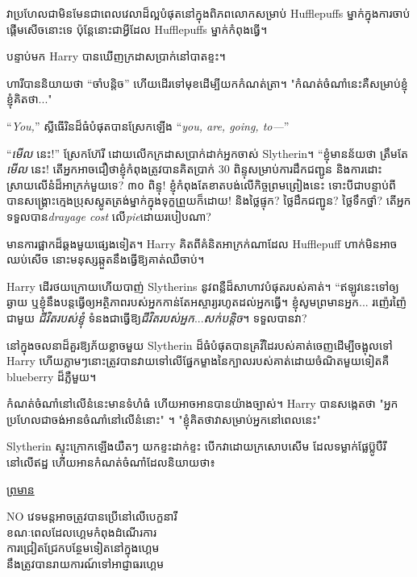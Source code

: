វាប្រហែលជាមិនមែនជាពេលវេលាដ៏ល្អបំផុតនៅក្នុងពិភពលោកសម្រាប់ Hufflepuffs ម្នាក់ក្នុងការចាប់ផ្តើមសើចនោះទេ ប៉ុន្តែនោះជាអ្វីដែល Hufflepuffs ម្នាក់កំពុងធ្វើ។

បន្ទាប់មក Harry បានឃើញក្រដាសប្រាក់នៅបាតខ្ទះ។

ហារី​បាន​និយាយ​ថា “ចាំ​បន្តិច” ហើយ​ដើរ​ទៅ​មុខ​ដើម្បី​យក​កំណត់​ត្រា។ "កំណត់ចំណាំនេះគឺសម្រាប់ខ្ញុំ ខ្ញុំគិតថា..."

“\emph{You,}” ស្លីធើរិនដ៏ធំបំផុតបានស្រែកឡើង “\emph{you, are, going, to—}”

“\emph{មើល} នេះ!” ស្រែក​ហ៊ែរី ដោយ​លើក​ក្រដាស​ប្រាក់​ដាក់​អ្នក​ចាស់ Slytherin។ “ខ្ញុំមានន័យថា ត្រឹមតែ\emph{មើល} នេះ! តើអ្នកអាចជឿថាខ្ញុំកំពុងត្រូវបានគិតប្រាក់ 30 ពិន្ទុសម្រាប់ការដឹកជញ្ជូន និងការដោះស្រាយលើនំដ៏អាក្រក់មួយទេ? ៣០ ពិន្ទុ! ខ្ញុំ​កំពុង​តែ​ខាតបង់​លើ​កិច្ច​ព្រម​ព្រៀង​នេះ ទោះ​បី​ជា​បន្ទាប់​ពី​បាន​សង្គ្រោះ​ក្មេង​ប្រុស​ស្លូត​ត្រង់​ម្នាក់​ក្នុង​ទុក្ខ​ព្រួយ​ក៏​ដោយ! និងថ្លៃផ្ទុក? ថ្លៃដឹកជញ្ជូន? ថ្លៃទឹកថ្នាំ? តើអ្នកទទួលបាន\emph{drayage cost} លើ\emph{pie}ដោយរបៀបណា?

មាន​ការ​ផ្អាក​ដ៏​ឆ្គង​មួយ​ផ្សេង​ទៀត។ Harry គិត​ពី​គំនិត​អាក្រក់​ណា​ដែល Hufflepuff ហាក់​មិន​អាច​ឈប់​សើច នោះ​មនុស្ស​ឆ្កួត​នឹង​ធ្វើ​ឱ្យ​គាត់​ឈឺចាប់។

Harry ដើរថយក្រោយហើយបាញ់ Slytherins នូវពន្លឺដ៏សាហាវបំផុតរបស់គាត់។ “ឥឡូវ​នេះ​ទៅ​ឲ្យ​ឆ្ងាយ ឬ​ខ្ញុំ​នឹង​បន្ត​ធ្វើ​ឲ្យ​អត្ថិភាព​របស់​អ្នក​កាន់​តែ​អស្ចារ្យ​រហូត​ដល់​អ្នក​ធ្វើ។ ខ្ញុំសូមព្រមានអ្នក... រញ៉េរញ៉ៃជាមួយ \emph{ជីវិតរបស់ខ្ញុំ} ទំនងជាធ្វើឱ្យ\emph{ជីវិតរបស់អ្នក}...\emph{សក់បន្តិច}។ ទទួលបានវា?

នៅក្នុងចលនាដ៏គួរឱ្យភ័យខ្លាចមួយ Slytherin ដ៏ធំបំផុតបានគ្រវីដៃរបស់គាត់ចេញដើម្បីចង្អុលទៅ Harry ហើយភ្លាមៗនោះត្រូវបានវាយទៅលើផ្នែកម្ខាងនៃក្បាលរបស់គាត់ដោយចំណិតមួយទៀតគឺ blueberry ដ៏ភ្លឺមួយ។

កំណត់ចំណាំនៅលើនំនេះមានទំហំធំ ហើយអាចអានបានយ៉ាងច្បាស់។ Harry បានសង្កេតថា "អ្នកប្រហែលជាចង់អានចំណាំនៅលើនំនោះ" ។ "ខ្ញុំគិតថាវាសម្រាប់អ្នកនៅពេលនេះ"

Slytherin ស្ទុះក្រោកឡើងយឺតៗ យកខ្ទះដាក់ខ្ទះ បើកវាដោយក្រសោបសើម ដែលទម្លាក់ផ្លែប៊្លូបឺរីនៅលើឥដ្ឋ ហើយអានកំណត់ចំណាំដែលនិយាយថា៖
\begin{writtenNote}
\MakeUppercase{\underline{ព្រមាន}}

\MakeUppercase{No} វេទមន្តអាចត្រូវបានប្រើនៅលើបេក្ខនារី\\
ខណៈពេលដែលហ្គេមកំពុងដំណើរការ\\
ការជ្រៀតជ្រែកបន្ថែមទៀតនៅក្នុងហ្គេម\\
\MakeUppercase{នឹង}ត្រូវបានរាយការណ៍ទៅអាជ្ញាធរហ្គេម
\end{writtenNote}

